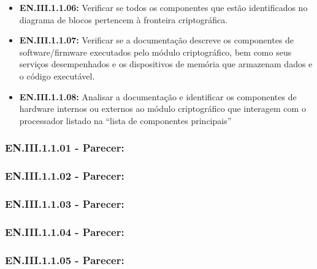 \begin{itemize}[leftmargin=*, nosep]
        \item \textbf{EN.III.1.1.06:} Verificar se todos os componentes que estão identificados no diagrama de blocos pertencem à fronteira criptográfica.
        \item \textbf{EN.III.1.1.07:} Verificar se a documentação descreve os componentes de software/firmware executados pelo módulo criptográfico, bem como seus serviços desempenhados e os dispositivos de memória que armazenam dados e o código executável.
        \item \textbf{EN.III.1.1.08:}  Analisar a documentação e identificar os componentes de hardware internos ou externos ao módulo criptográfico que interagem com o processador listado na “lista de componentes principais”
    \end{itemize}

    \vspace{1cm} 
    
    \subsubsection*{EN.III.1.1.01 - Parecer:}
    
    \vspace{1cm} 
    
    \subsubsection*{EN.III.1.1.02 - Parecer:}
    
    \vspace{1cm} 
    
    \subsubsection*{EN.III.1.1.03 - Parecer:}
    
    \vspace{1cm} 
    
    \subsubsection*{EN.III.1.1.04 - Parecer:}
    
    \vspace{1cm} 
    
    \subsubsection*{EN.III.1.1.05 - Parecer:}
    
